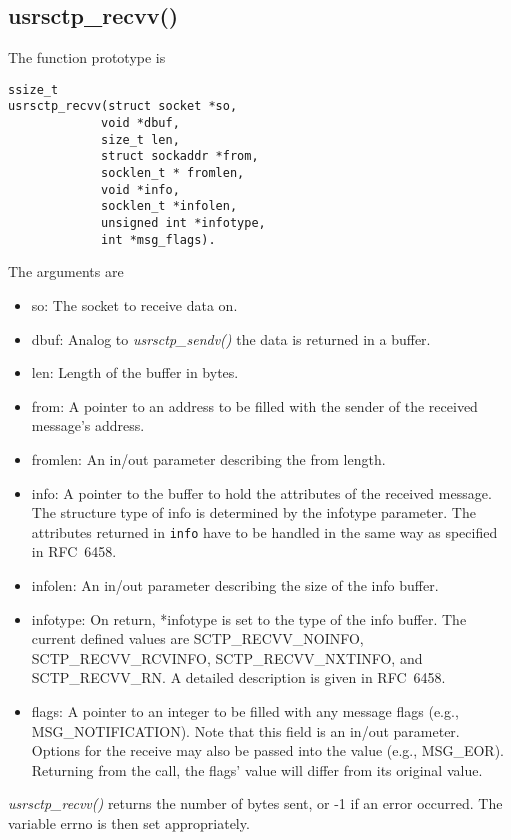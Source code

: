 \documentclass[a4paper]{article}
\begin{document}
\subsection{usrsctp\_recvv()}
The function prototype is
\begin{verbatim}
ssize_t
usrsctp_recvv(struct socket *so,
             void *dbuf,
             size_t len,
             struct sockaddr *from,
             socklen_t * fromlen,
             void *info,
             socklen_t *infolen,
             unsigned int *infotype,
             int *msg_flags).
\end{verbatim}
The arguments are
\begin{itemize}
\item so: The socket to receive data on.
\item dbuf: Analog to \textit{usrsctp\_sendv()} the data is returned in a buffer.
\item len: Length of the buffer in bytes.
\item from: A pointer to an address to be filled with the sender of the
      received message's address.
\item fromlen: An in/out parameter describing the from length.
\item info: A pointer to the buffer to hold the attributes of the received
      message.  The structure type of info is determined by the
      infotype parameter. The attributes returned in \texttt{info} have to be 
      handled in the same way as specified in RFC~6458.
\item infolen:  An in/out parameter describing the size of the info buffer.
\item infotype:  On return, *infotype is set to the type of the info
      buffer.  The current defined values are SCTP\_RECVV\_NOINFO, 
      SCTP\_RECVV\_RCVINFO, SCTP\_RECVV\_NXTINFO, and
      SCTP\_RECVV\_RN. A detailed description is given in RFC~6458.
\item flags: A pointer to an integer to be filled with any message flags
      (e.g., MSG\_NOTIFICATION).  Note that this field is an in/out
      parameter.  Options for the receive may also be passed into the
      value (e.g., MSG\_EOR).  Returning from the call, the flags' value
      will differ from its original value.
\end{itemize}

\textit{usrsctp\_recvv()} returns the number of bytes sent, or -1 if an error
occurred.  The variable errno is then set appropriately.

  
\end{document}

